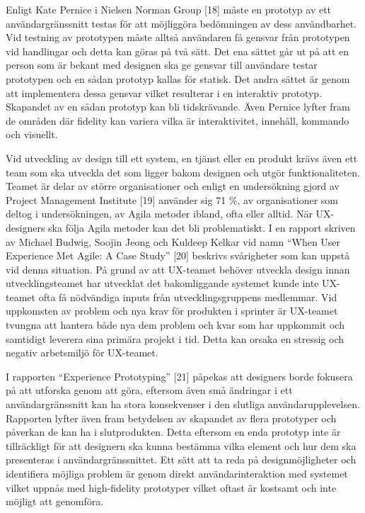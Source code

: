 \documentclass[12pt]{kththesis}
\begin{document}
Enligt Kate Pernice i Nielsen Norman Group [18] måste en prototyp av ett användargränssnitt testas för att möjliggöra bedömningen av dess användbarhet. Vid testning av prototypen måste alltså användaren få gensvar från prototypen vid handlingar och detta kan göras på två sätt. Det ena sättet går ut på att en person som är bekant med designen ska ge gensvar till användare testar prototypen och en sådan prototyp kallas för statisk.  Det andra sättet är genom att implementera dessa gensvar vilket resulterar i en interaktiv prototyp. Skapandet av en sådan prototyp kan bli tidskrävande. Även Pernice lyfter fram de områden där fidelity kan variera vilka är interaktivitet, innehåll, kommando och visuellt. 

Vid utveckling av design till ett system, en tjänst eller en produkt krävs även ett team som ska utveckla det som ligger bakom designen och utgör funktionaliteten. Teamet är delar av större organisationer och enligt en undersökning gjord av Project Management Institute [19] använder sig 71 \%, av organisationer som deltog i undersökningen, av Agila metoder ibland, ofta eller alltid. När UX-designers ska följa Agila metoder kan det bli problematiskt. I en rapport skriven av Michael Budwig, Soojin Jeong och Kuldeep Kelkar vid namn “When User Experience Met Agile: A Case Study” [20] beskrivs svårigheter som kan uppstå vid denna situation. På grund av att UX-teamet behöver utveckla design innan utvecklingsteamet har utvecklat det bakomliggande systemet kunde inte UX-teamet ofta få nödvändiga inputs från utvecklingsgruppens medlemmar. Vid uppkomsten av problem och nya krav för produkten i sprinter är UX-teamet tvungna att hantera både nya dem problem och kvar som har uppkommit och samtidigt leverera sina primära projekt i tid. Detta kan orsaka en stressig och negativ arbetsmiljö för UX-teamet. 

I rapporten “Experience Prototyping” [21] påpekas att designers borde fokusera på att utforska genom att göra, eftersom även små ändringar i ett användargränssnitt kan ha stora konsekvenser i den slutliga användarupplevelsen. Rapporten lyfter även fram betydelsen av skapandet av flera prototyper och påverkan de kan ha i slutprodukten. Detta eftersom en enda prototyp inte är tillräckligt för att designern ska kunna bestämma vilka element och hur dem ska presenteras i användargränssnittet. Ett sätt att ta reda på designmöjligheter och identifiera möjliga problem är genom direkt användarinteraktion med systemet vilket uppnås med high-fidelity prototyper vilket oftast är kostsamt och inte möjligt att genomföra.
\end{document}
